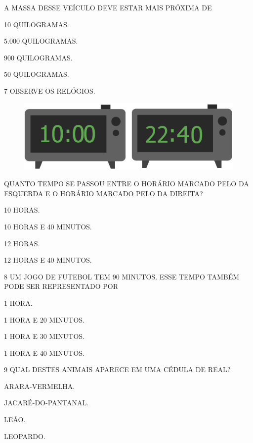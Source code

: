 A MASSA DESSE VEÍCULO DEVE ESTAR MAIS PRÓXIMA DE

\begin{escolha}[itemsep=0pt]
\item 10 QUILOGRAMAS.

\item 5.000 QUILOGRAMAS.

\item 900 QUILOGRAMAS.

\item 50 QUILOGRAMAS.
\end{escolha}


\num{7} OBSERVE OS RELÓGIOS.

\begin{figure}[htpb!]
\centering
\includegraphics[width=.3\textwidth]{./media/SAEB_1ANO_MAT_FIGURA139.png}
\end{figure}

QUANTO TEMPO SE PASSOU ENTRE O HORÁRIO MARCADO PELO DA ESQUERDA E O HORÁRIO MARCADO PELO DA DIREITA?

\begin{escolha}[itemsep=0pt]
\item 10 HORAS.

\item 10 HORAS E 40 MINUTOS.

\item 12 HORAS.

\item 12 HORAS E 40 MINUTOS.
\end{escolha}

\num{8} UM JOGO DE FUTEBOL TEM 90 MINUTOS. ESSE TEMPO TAMBÉM PODE SER
REPRESENTADO POR

\begin{escolha}[itemsep=0pt]
\item 1 HORA.

\item 1 HORA E 20 MINUTOS.

\item 1 HORA E 30 MINUTOS.

\item 1 HORA E 40 MINUTOS.
\end{escolha}


\num{9} QUAL DESTES ANIMAIS APARECE EM UMA CÉDULA DE REAL?

\begin{escolha}[itemsep=0pt]
\item ARARA-VERMELHA.

\item JACARÉ-DO-PANTANAL.

\item LEÃO.

\item LEOPARDO.
\end{escolha}

